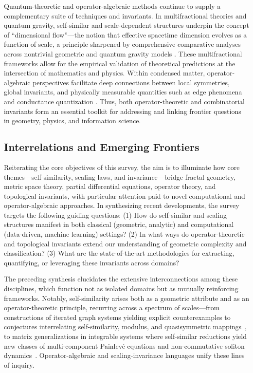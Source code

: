\documentclass[sigconf]{acmart}
\begin{document}
Quantum-theoretic and operator-algebraic methods continue to supply a complementary suite of techniques and invariants. In multifractional theories and quantum gravity, self-similar and scale-dependent structures underpin the concept of ``dimensional flow''—the notion that effective spacetime dimension evolves as a function of scale, a principle sharpened by comprehensive comparative analyses across nontrivial geometric and quantum gravity models \cite{ref5,ref7,ref20}. These multifractional frameworks allow for the empirical validation of theoretical predictions at the intersection of mathematics and physics. Within condensed matter, operator-algebraic perspectives facilitate deep connections between local symmetries, global invariants, and physically measurable quantities such as edge phenomena and conductance quantization \cite{ref56,ref57,ref58}. Thus, both operator-theoretic and combinatorial invariants form an essential toolkit for addressing and linking frontier questions in geometry, physics, and information science.

\subsection{Interrelations and Emerging Frontiers}

Reiterating the core objectives of this survey, the aim is to illuminate how core themes---self-similarity, scaling laws, and invariance---bridge fractal geometry, metric space theory, partial differential equations, operator theory, and topological invariants, with particular attention paid to novel computational and operator-algebraic approaches. In synthesizing recent developments, the survey targets the following guiding questions: (1) How do self-similar and scaling structures manifest in both classical (geometric, analytic) and computational (data-driven, machine learning) settings? (2) In what ways do operator-theoretic and topological invariants extend our understanding of geometric complexity and classification? (3) What are the state-of-the-art methodologies for extracting, quantifying, or leveraging these invariants across domains?

The preceding synthesis elucidates the extensive interconnections among these disciplines, which function not as isolated domains but as mutually reinforcing frameworks. Notably, self-similarity arises both as a geometric attribute and as an operator-theoretic principle, recurring across a spectrum of scales---from constructions of iterated graph systems yielding explicit counterexamples to conjectures interrelating self-similarity, modulus, and quasisymmetric mappings~\cite{ref35}, to matrix generalizations in integrable systems where self-similar reductions yield new classes of multi-component Painlevé equations and non-commutative soliton dynamics~\cite{ref64}. Operator-algebraic and scaling-invariance languages unify these lines of inquiry.
\end{document}
